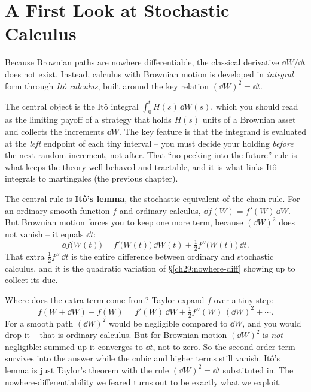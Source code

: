 \section{A First Look at Stochastic Calculus}
\label{ch29:ito}

Because Brownian paths are nowhere differentiable, the classical derivative
$\dd W/\dd t$ does not exist. Instead, calculus with Brownian motion is developed in
\emph{integral} form through \emph{It\^o calculus}, built around the key relation
$(\dd W)^2 = \dd t$.

The central object is the It\^o integral $\int_0^t H(s)\,\dd W(s)$, which you
should read as the limiting payoff of a strategy that holds $H(s)$ units of a
Brownian asset and collects the increments $\dd W$. The key feature is that the integrand is
evaluated at the \emph{left} endpoint of each tiny interval -- you must decide
your holding \emph{before} the next random increment, not after. That ``no
peeking into the future'' rule is what keeps the theory well behaved and
tractable, and it is what links It\^o integrals to martingales (the previous
chapter).

The central rule is \textbf{It\^o's lemma}, the stochastic equivalent of the chain rule. For
an ordinary smooth function $f$ and ordinary calculus, $\dd f(W) = f'(W)\,\dd W$.
But Brownian motion forces you to keep one more term, because $(\dd W)^2$ does not
vanish -- it equals $\dd t$:
\[
  \boxed{\;\dd f\big(W(t)\big) = f'\big(W(t)\big)\,\dd W(t)
  + \tfrac12 f''\big(W(t)\big)\,\dd t.\;}
\]
That extra $\tfrac12 f''\,\dd t$ is the entire difference between ordinary and
stochastic calculus, and it is the quadratic variation of
\S\ref{ch29:nowhere-diff} showing up to collect its due.

\begin{whybox}
Where does the extra term come from? Taylor-expand $f$ over a tiny step:
\[
  f(W+\dd W) - f(W)
  = f'(W)\,\dd W + \tfrac12 f''(W)\,(\dd W)^2 + \cdots.
\]
For a smooth path $(\dd W)^2$ would be negligible compared to $\dd W$, and you
would drop it -- that is ordinary calculus. But for Brownian motion $(\dd W)^2$ is
\emph{not} negligible: summed up it converges to $\dd t$, not to zero. So the
second-order term survives into the answer while the cubic and higher terms still
vanish. It\^o's lemma is just Taylor's theorem with the rule $(\dd W)^2=\dd t$
substituted in. The nowhere-differentiability we feared turns out to be exactly
what we exploit.
\end{whybox}

